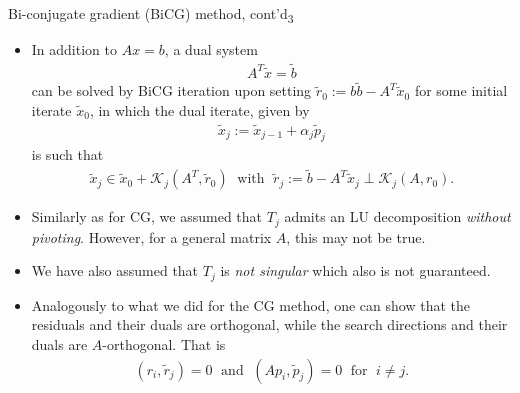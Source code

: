 \documentclass[t,usepdftitle=false]{beamer}
\begin{document}
\begin{frame}{Bi-conjugate gradient (BiCG) method, cont'd\textsubscript{3}}
\begin{itemize}
\item In addition to $Ax=b$, a dual system
\begin{align*}
A^T\tilde{x}=\tilde{b}
\end{align*}
can be solved by BiCG iteration upon setting $\tilde{r}_0:=b\tilde{b}-A^T\tilde{x}_0$ for some initial iterate $\tilde{x}_0$, in which the dual iterate, given by
\begin{align*}
\tilde{x}_j:=\tilde{x}_{j-1}+\alpha_j\tilde{p}_j
\end{align*}
is such that
\begin{align*}
\tilde{x}_j\in\tilde{x}_0+\mathcal{K}_j(A^T,\tilde{r}_0)
\;\text{ with }\;
\tilde{r}_j:=\tilde{b}-A^T\tilde{x}_j\perp \mathcal{K}_j(A,r_0).
\end{align*}
\item Similarly as for CG, we assumed that $T_j$ admits an LU decomposition \textit{without pivoting}.
However, for a general matrix $A$, this may not be true.
\item[] We have also assumed that $T_j$ is \textit{not singular} which also is not guaranteed.
\item Analogously to what we did for the CG method, one can show that the residuals and their duals are orthogonal, while the search directions and their duals are $A$-orthogonal.
That is
\begin{align*}
(r_i,\tilde{r}_j)=0
\;\text{ and }\;
(Ap_i,\tilde{p}_j)=0
\;\text{ for }\;i\neq j.
\end{align*}
\end{itemize}
\end{frame}
\end{document}
